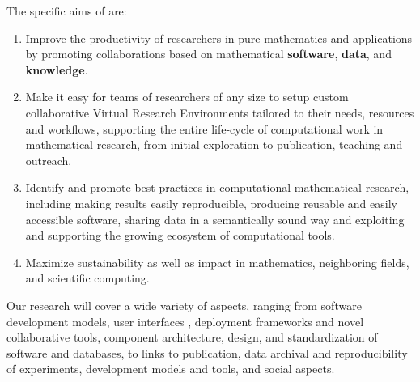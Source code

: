 \documentclass[noworkareas,deliverables,keys]{euproposal}                  %
\begin{document}
\begin{proposal}

The specific aims of \TheProject are:


\begin{enumerate}
\item \label{aim:collaboration} Improve the productivity of
  researchers in pure mathematics and applications by promoting
  collaborations based on mathematical \textbf{software},
  \textbf{data}, and \textbf{knowledge}.
\item \label{aim:vre} Make it easy for teams of
  researchers of any size to setup custom collaborative Virtual Research
  Environments tailored to their needs, resources and workflows, supporting the
  entire life-cycle of computational work in mathematical research,
  from initial exploration to publication, teaching and outreach.
\item \label{aim:sharing} Identify and promote best practices in
  computational mathematical research, including making results easily
  reproducible, producing reusable and easily accessible
  software, sharing data in a semantically sound way and exploiting and
  supporting the growing ecosystem of computational tools.
\item \label{aim:impact} Maximize sustainability as well as impact in
  mathematics, neighboring fields, and scientific computing.

\end{enumerate}



Our research will cover a wide variety of aspects, ranging from
software development models, user interfaces , deployment frameworks and novel collaborative tools,
component architecture, design, and standardization of software
 and databases, to links to publication, data archival
and reproducibility of experiments, development models and tools, and
social aspects.



\end{proposal}
\end{document}
